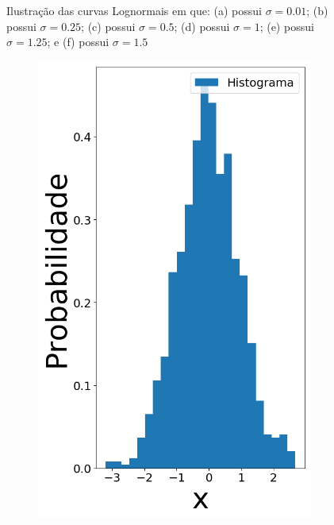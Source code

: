 \begin{figure}[H]
\begin{subfigure}[b]{0.3\textwidth}
		\caption{}
		\label{fig:sig150}
	\end{subfigure}
	
	\caption{Ilustração das curvas Lognormais em que: (a) possui $\sigma = 0.01$; (b) possui $\sigma = 0.25$; (c) possui $\sigma = 0.5$; (d) possui $\sigma = 1$; (e) possui $\sigma = 1.25$; e (f) possui $\sigma = 1.5$}
	\label{fig:Lognormal}
\end{figure}



\begin{figure}[H]
	\centering
	\begin{subfigure}[b]{0.27\textwidth}
		\centering 
		\includegraphics[width=\linewidth]{./figuras/datanormal_0}

\end{subfigure}
\end{figure}

